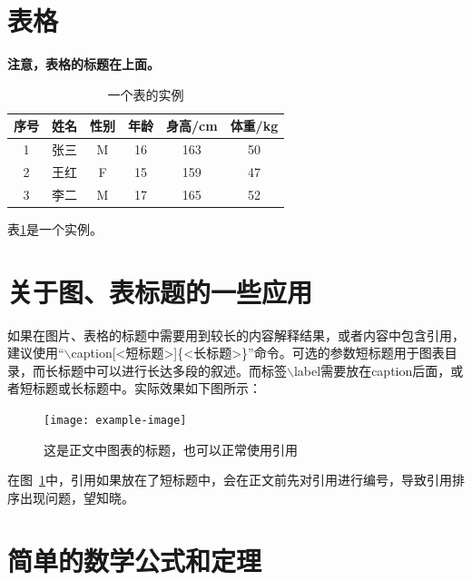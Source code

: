 \section{表格}

\par \textbf{注意，表格的标题在上面。}

\begin{table}[!ht]
\centering
\caption{一个表的实例}
\label{tab:tabobj}
    \begin{tabular}{cccccc}
        \toprule
        序号 & 姓名 & 性别 & 年龄 & 身高/cm & 体重/kg \\
        \midrule
        1 & 张三 & M & 16 & 163 & 50 \\
        2 & 王红 & F & 15 & 159 & 47 \\
        3 & 李二 & M & 17 & 165 & 52 \\
        \bottomrule
    \end{tabular}
\end{table}

\par 表\ref{tab:tabobj}是一个实例。

\section{关于图、表标题的一些应用}

\par 如果在图片、表格的标题中需要用到较长的内容解释结果，或者内容中包含引用，建议使用``$\backslash$caption[<短标题>]\{<长标题>\}''命令。可选的参数短标题用于图表目录，而长标题中可以进行长达多段的叙述。而标签$\backslash$label需要放在caption后面，或者短标题或长标题中。实际效果如下图所示：

\begin{figure}[!ht]
    \centering
    \texttt{[image: example-image]}
    \caption[这是图目录中的标题]{这是正文中图表的标题，也可以正常使用引用\cite{broder1997resemblance}}\label{fig:image}
\end{figure}

在图~\ref{fig:image}中，引用如果放在了短标题中，会在正文前先对引用进行编号，导致引用排序出现问题，望知晓。


\section{简单的数学公式和定理}

